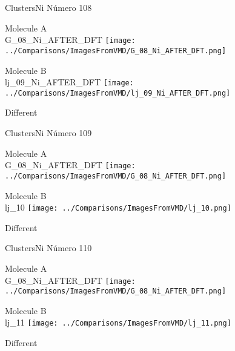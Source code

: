  \newpage

\vtab[-3cm]
\begin{center}
{\large ClustersNi \tab Número 108}
\end{center}
\begin{multicols}{2}
\begin{center}
Molecule A \\ 
G\_08\_Ni\_AFTER\_DFT
\texttt{[image: ../Comparisons/ImagesFromVMD/G\_08\_Ni\_AFTER\_DFT.png]}
\\
\vtab

\columnbreak
Molecule B \\ 
lj\_09\_Ni\_AFTER\_DFT
\texttt{[image: ../Comparisons/ImagesFromVMD/lj\_09\_Ni\_AFTER\_DFT.png]}
\\
\vtab


\end{center}
\end{multicols}
\begin{center}
\textcolor{NavyBlue}{\Large Different}
\end{center}

 \newpage

\vtab[-3cm]
\begin{center}
{\large ClustersNi \tab Número 109}
\end{center}
\begin{multicols}{2}
\begin{center}
Molecule A \\ 
G\_08\_Ni\_AFTER\_DFT
\texttt{[image: ../Comparisons/ImagesFromVMD/G\_08\_Ni\_AFTER\_DFT.png]}
\\
\vtab

\columnbreak
Molecule B \\ 
lj\_10
\texttt{[image: ../Comparisons/ImagesFromVMD/lj\_10.png]}
\\
\vtab


\end{center}
\end{multicols}
\begin{center}
\textcolor{NavyBlue}{\Large Different}
\end{center}

 \newpage

\vtab[-3cm]
\begin{center}
{\large ClustersNi \tab Número 110}
\end{center}
\begin{multicols}{2}
\begin{center}
Molecule A \\ 
G\_08\_Ni\_AFTER\_DFT
\texttt{[image: ../Comparisons/ImagesFromVMD/G\_08\_Ni\_AFTER\_DFT.png]}
\\
\vtab

\columnbreak
Molecule B \\ 
lj\_11
\texttt{[image: ../Comparisons/ImagesFromVMD/lj\_11.png]}
\\
\vtab


\end{center}
\end{multicols}
\begin{center}
\textcolor{NavyBlue}{\Large Different}
\end{center}

